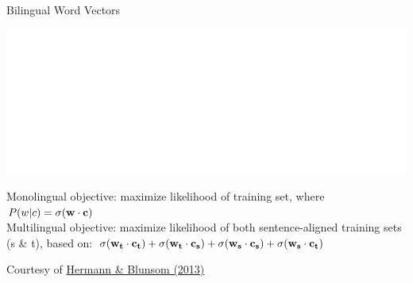 \documentclass[xcolor=pdftex,x11names,table,hyperref]{beamer}
\begin{document}
\begin{frame}{Bilingual Word Vectors}
\begin{center}
	\includegraphics[height=0.42\textheight]{images/hermann-blunsom2013_fig3.pdf}
\end{center}

\pause
Monolingual objective: maximize likelihood of training set, where $P(w|c) = \sigma({\bf w \cdot c})$ \\[1.0em]
Multilingual objective: maximize likelihood of both sentence-aligned training sets (s \& t), based on: $\sigma({\bf w_t \cdot c_t}) + \sigma({\bf w_t \cdot c_s}) + \sigma({\bf w_s \cdot c_s}) + \sigma({\bf w_s \cdot c_t})$

\vspace*{2.0em}
{\tiny Courtesy of \href{http://arxiv.org/abs/1312.6173}{Hermann \& Blunsom (2013)}}
\end{frame}
\end{document}
